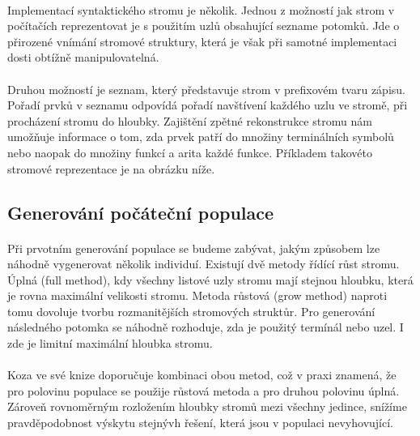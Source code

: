\documentclass[bc,male,java,dept460]{diploma}		%
\begin{document}
\paragraph*{}
Implementací syntaktického stromu je několik. Jednou z možností jak strom v počítačích reprezentovat je s použitím uzlů obsahující sezname potomků. Jde o přirozené vnímání stromové struktury, která je však při samotné implementaci dosti obtížně manipulovatelná. 

\paragraph*{}
Druhou možností je seznam, který představuje strom v prefixovém tvaru zápisu. Pořadí prvků v seznamu odpovídá pořadí navštívení každého uzlu ve stromě, při procházení stromu do hloubky. Zajištění zpětné rekonstrukce stromu nám umožňuje informace o tom, zda prvek patří do množiny terminálních symbolů nebo naopak do množiny funkcí a arita každé funkce. Příkladem takovéto stromové reprezentace je na obrázku níže.


\subsection{Generování počáteční populace}
\paragraph*{}
Při prvotním generování populace se budeme zabývat, jakým způsobem lze náhodně vygenerovat několik individuí. Existují dvě metody řídící růst stromu. Úplná (full method), kdy všechny listové uzly stromu mají stejnou hloubku, která je rovna maximální velikosti stromu. Metoda růstová (grow method) naproti tomu dovoluje tvorbu rozmanitějších stromových struktůr. Pro generování následného potomka se náhodně rozhoduje, zda je použitý termínál nebo uzel. I zde je limitní maximální hloubka stromu.

\paragraph*{}
Koza ve své knize \cite{kozagp} doporučuje kombinaci obou metod, což v praxi znamená, že pro polovinu populace se použije růstová metoda a pro druhou polovinu úplná. Zároveň rovnoměrným rozložením hloubky stromů mezi všechny jedince, snížíme pravděpodobnost výskytu stejnývh řešení, která jsou v populaci nevyhovující. 
\end{document}
